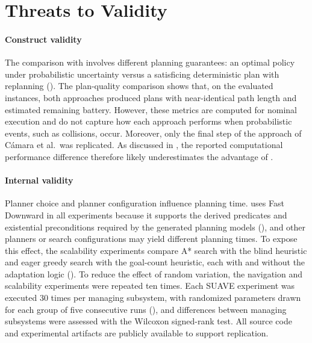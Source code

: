 \section{Threats to Validity}\label{planta:sec:threats}


\paragraph{Construct validity}
The comparison with \CamaraApproach involves different planning guarantees: an optimal policy under probabilistic uncertainty versus a satisficing deterministic plan with replanning (). The plan-quality comparison shows that, on the evaluated instances, both approaches produced plans with near-identical path length and estimated remaining battery. However, these metrics are computed for nominal execution and do not capture how each approach performs when probabilistic events, such as collisions, occur. Moreover, only the final step of the approach of Cámara et al.\ was replicated. As discussed in , the reported computational performance difference therefore likely underestimates the advantage of \planta.

\paragraph{Internal validity}
Planner choice and planner configuration influence planning time. \planta uses Fast Downward in all experiments because it supports the derived predicates and existential preconditions required by the generated planning models (), and other planners or search configurations may yield different planning times. To expose this effect, the scalability experiments compare A* search with the blind heuristic and eager greedy search with the goal-count heuristic, each with and without the adaptation logic (). To reduce the effect of random variation, the navigation and scalability experiments were repeated ten times. Each SUAVE experiment was executed 30 times per managing subsystem, with randomized parameters drawn for each group of five consecutive runs (), and differences between managing subsystems were assessed with the Wilcoxon signed-rank test. All source code and experimental artifacts are publicly available to support replication. %


